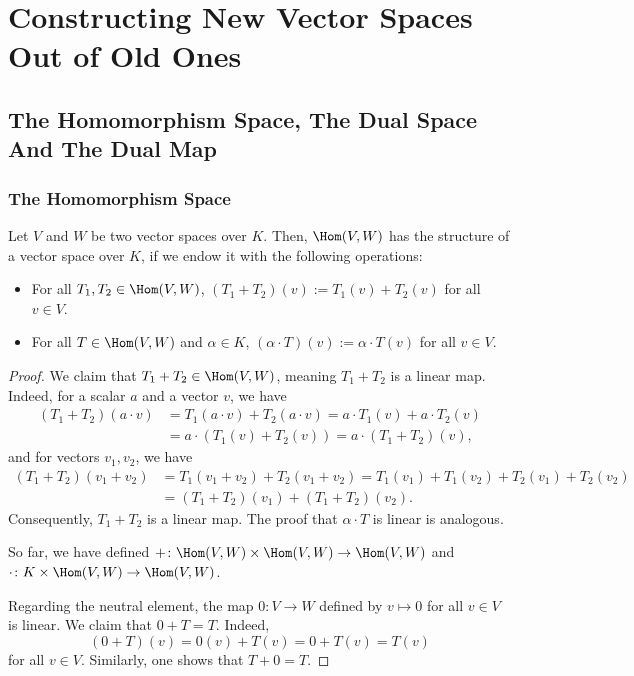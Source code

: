 \setcounter{chapter}{17} %
\chapter{Constructing New Vector Spaces Out of Old Ones}

\setcounter{section}{0}
\section{The Homomorphism Space, The Dual Space And The Dual Map}

\subsection{The Homomorphism Space}

\begin{proposition}
  Let $V$ and $W$ be two vector spaces over $K$. Then, $\Hom(V,W)$ has the structure of a vector space over $K$, if we endow it with the following operations:
  \begin{itemize}
    \item For all $T_1, T_2 \in \Hom(V,W)$, $(T_1 + T_2)(v) := T_1(v) + T_2(v)$ for all $v \in V$.
    \item For all $T \in \Hom(V,W)$ and $\alpha \in K$, $(\alpha \cdot T)(v) := \alpha \cdot T(v)$ for all $v \in V$.
  \end{itemize}
\end{proposition} 

\begin{proof}
  We claim that $T_1 + T_2 \in \Hom(V,W)$, meaning $T_1 + T_2$ is a linear map. Indeed, for a scalar $a$ and a vector $v$, we have
  \begin{align*}
    (T_1 + T_2)(a \cdot v) &= T_1(a \cdot v) + T_2(a \cdot v) = a \cdot T_1(v) + a \cdot T_2(v) \\
    &= a \cdot (T_1(v) + T_2(v)) = a \cdot (T_1 + T_2)(v),
  \end{align*}
  and for vectors $v_1, v_2$, we have
  \begin{align*}
    (T_1 + T_2)(v_1 + v_2) &= T_1(v_1 + v_2) + T_2(v_1 + v_2) = T_1(v_1) + T_1(v_2) + T_2(v_1) + T_2(v_2) \\
    &= (T_1 + T_2)(v_1) + (T_1 + T_2)(v_2).
  \end{align*}
  Consequently, $T_1 + T_2$ is a linear map. The proof that $\alpha \cdot T$ is linear is analogous.

  So far, we have defined $+ \colon \Hom(V,W) \times \Hom(V,W) \to \Hom(V,W)$ and $\cdot \colon K \times \Hom(V,W) \to \Hom(V,W)$.

  Regarding the neutral element, the map $0 \colon V \to W$ defined by $v \mapsto 0$ for all $v \in V$ is linear. We claim that $0 + T = T$. Indeed,
  \[ (0 + T)(v) = 0(v) + T(v) = 0 + T(v) = T(v) \]
  for all $v \in V$. Similarly, one shows that $T + 0 = T$.
\end{proof}

